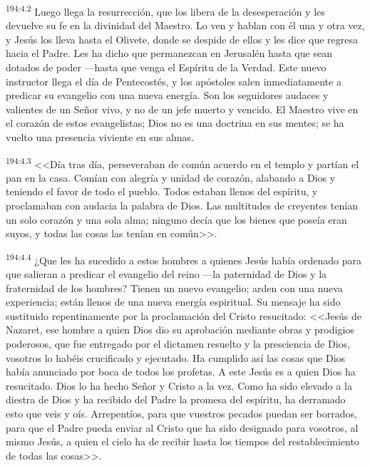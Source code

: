 \par 
\textsuperscript{194:4.2} Luego llega la resurrección, que los libera de la desesperación y les devuelve su fe en la divinidad del Maestro. Lo ven y hablan con él una y otra vez, y Jesús los lleva hasta el Olivete, donde se despide de ellos y les dice que regresa hacia el Padre. Les ha dicho que permanezcan en Jerusalén hasta que sean dotados de poder ---hasta que venga el Espíritu de la Verdad. Este nuevo instructor llega el día de Pentecostés, y los apóstoles salen inmediatamente a predicar su evangelio con una nueva energía. Son los seguidores audaces y valientes de un Señor vivo, y no de un jefe muerto y vencido. El Maestro vive en el corazón de estos evangelistas; Dios no es una doctrina en sus mentes; se ha vuelto una presencia viviente en sus almas.

\par 
\textsuperscript{194:4.3} <<Día tras día, perseveraban de común acuerdo en el templo y partían el pan en la casa. Comían con alegría y unidad de corazón, alabando a Dios y teniendo el favor de todo el pueblo. Todos estaban llenos del espíritu, y proclamaban con audacia la palabra de Dios. Las multitudes de creyentes tenían un solo corazón y una sola alma; ninguno decía que los bienes que poseía eran suyos, y todas las cosas las tenían en común>>.

\par 
\textsuperscript{194:4.4} ¿Que les ha sucedido a estos hombres a quienes Jesús había ordenado para que salieran a predicar el evangelio del reino ---la paternidad de Dios y la fraternidad de los hombres? Tienen un nuevo evangelio; arden con una nueva experiencia; están llenos de una nueva energía espiritual. Su mensaje ha sido sustituido repentinamente por la proclamación del Cristo resucitado: <<Jesús de Nazaret, ese hombre a quien Dios dio su aprobación mediante obras y prodigios poderosos, que fue entregado por el dictamen resuelto y la presciencia de Dios, vosotros lo habéis crucificado y ejecutado. Ha cumplido así las cosas que Dios había anunciado por boca de todos los profetas. A este Jesús es a quien Dios ha resucitado. Dios lo ha hecho Señor y Cristo a la vez. Como ha sido elevado a la diestra de Dios y ha recibido del Padre la promesa del espíritu, ha derramado esto que veis y oís. Arrepentíos, para que vuestros pecados puedan ser borrados, para que el Padre pueda enviar al Cristo que ha sido designado para vosotros, al mismo Jesús, a quien el cielo ha de recibir hasta los tiempos del restablecimiento de todas las cosas>>.

